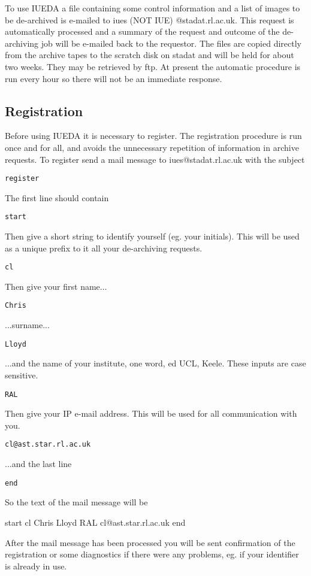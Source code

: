 \documentclass[11pt,twoside,nolof,noabs]{starlink}
\begin{document}
To use IUEDA a file containing some control information and a list of
images to be de-archived is e-mailed to iues (NOT IUE) @stadat.rl.ac.uk.
This request is automatically processed and a summary of the request
and outcome of
the de-archiving job will be e-mailed back to the requestor.
The files are
copied directly from the archive tapes to the scratch disk on stadat and
will be held for about two weeks. They may be retrieved by ftp.
At present the automatic procedure is run every hour so there will not be
an immediate response.

\subsection{Registration}

Before using IUEDA it is necessary to register.
The registration procedure is run once and for all, and avoids the unnecessary
repetition of information in archive requests.
To register send a mail message to iues@stadat.rl.ac.uk
with the subject

\texttt{register}

The first line should contain

\texttt{start}

Then give a short string to identify yourself (eg. your initials).
This will be used as a unique prefix to {it all\/} your de-archiving requests.

\texttt{cl}

Then give your first name...

\texttt{Chris}

...surname...

\texttt{Lloyd}

...and the name of your institute, one word, ed UCL, Keele. These inputs are
case sensitive.

\texttt{RAL}

Then give your IP e-mail address.
This will be used for all communication with you.

\texttt{cl@ast.star.rl.ac.uk}

...and the last line

\texttt{end}

So the text of the mail message will be

\begin{terminalv}
start
cl
Chris
Lloyd
RAL
cl@ast.star.rl.ac.uk
end
\end{terminalv}

After the mail message has been processed you will be sent confirmation
of the registration or some diagnostics if there were any problems, eg. if your
identifier is already in use.
\end{document}
